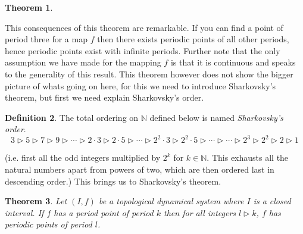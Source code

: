 \documentclass[11pt,a4paper,oneside]{memoir}
\theoremstyle{plain}
\newtheorem{thm}{Theorem}[chapter]
\theoremstyle{definition}
\newtheorem{defn}[thm]{Definition}
\begin{document}
\begin{thm}
    \begin{center}
    \end{center}

\end{thm}

This consequences of this theorem are remarkable. If you can find a point of period three for a map $f$ then there exists periodic points of all other periods, hence periodic points exist with infinite periods. Further note that the only assumption we have made for the mapping $f$ is that it is continuous and speaks to the generality of this result. This theorem however does not show the bigger picture of whats going on here, for this we need to introduce Sharkovsky's theorem, but first we need explain Sharkovsky's order.

\begin{defn}
    The total ordering on $\mathbb{N}$ defined below is named \emph{Sharkovsky's order}. \[ 3 \rhd 5 \rhd 7 \rhd 9 \rhd \cdots \rhd 2 \cdot 3 \rhd 2 \cdot 5 \rhd \cdots \rhd 2^2 \cdot 3 \rhd 2^2 \cdot 5 \rhd \cdots \rhd \cdots \rhd 2^3 \rhd 2^2 \rhd 2 \rhd 1 \]
\end{defn}
(i.e. first all the odd integers multiplied by $2^k$ for $k \in \mathbb{N}$. This exhausts all the natural numbers apart from powers of two, which are then ordered last in descending order.) This brings us to Sharkovsky's theorem.

\begin{thm}
    Let $(I, f)$ be a topological dynamical system where $I$ is a closed interval. If $f$ has a period point of period $k$ then for all integers $l \rhd k$, $f$ has periodic points of period $l$.
\end{thm}
\end{document}
